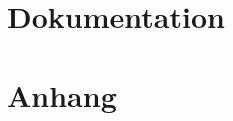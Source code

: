 \documentclass[twoside, openany, 11pt]{article}
\begin{document}
  

  \setcounter{page}{2}

  
  \newpage
  
  \newpage

  \tableofcontents
  \newpage

  \setcounter{page}{1}

  \part{Dokumentation}
  
  
  
  

  \part{Anhang}
  \appendix
  
  
  
  
\end{document}

